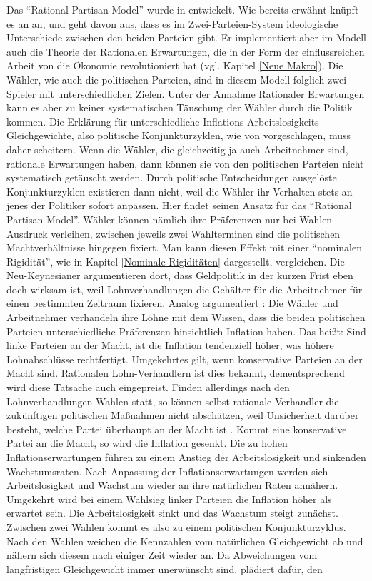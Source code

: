 Das "`Rational Partisan-Model"' wurde in \textcite{Alesina1987} entwickelt. Wie bereits erwähnt knüpft es an \textcite{Hibbs1977} an, und geht davon aus, dass es im Zwei-Parteien-System ideologische Unterschiede zwischen den beiden Parteien gibt. Er implementiert aber im Modell auch die Theorie der Rationalen Erwartungen, die in der Form der einflussreichen Arbeit von \textcite{Kydland1977} die Ökonomie revolutioniert hat (vgl. Kapitel \ref{Neue Makro}). Die Wähler, wie auch die politischen Parteien, sind in diesem Modell folglich zwei Spieler mit unterschiedlichen Zielen. Unter der Annahme Rationaler Erwartungen kann es aber zu keiner systematischen Täuschung der Wähler durch die Politik kommen. Die Erklärung für unterschiedliche Inflations-Arbeitslosigkeits-Gleichgewichte, also politische Konjunkturzyklen, wie von \textcite{Nordhaus1975} vorgeschlagen, muss daher scheitern. Wenn die Wähler, die gleichzeitig ja auch Arbeitnehmer sind, rationale Erwartungen haben, dann können sie von den politischen Parteien nicht systematisch getäuscht werden. Durch politische Entscheidungen ausgelöste Konjunkturzyklen existieren dann nicht, weil die Wähler ihr Verhalten stets an jenes der Politiker sofort anpassen. Hier findet \textcite{Alesina1987} seinen Ansatz für das "`Rational Partisan-Model"'. Wähler können nämlich ihre Präferenzen nur bei Wahlen Ausdruck verleihen, zwischen jeweils zwei Wahlterminen sind die politischen Machtverhältnisse hingegen fixiert. Man kann diesen Effekt mit einer "`nominalen Rigidität"', wie in Kapitel \ref{Nominale Rigiditäten} dargestellt, vergleichen. Die Neu-Keynesianer argumentieren dort, dass Geldpolitik in der kurzen Frist eben doch wirksam ist, weil Lohnverhandlungen die Gehälter für die Arbeitnehmer für einen bestimmten Zeitraum fixieren. Analog argumentiert \textcite{Alesina1987}: Die Wähler und Arbeitnehmer verhandeln ihre Löhne mit dem Wissen, dass die beiden politischen Parteien unterschiedliche Präferenzen hinsichtlich Inflation haben. Das heißt: Sind linke Parteien an der Macht, ist die Inflation tendenziell höher, was höhere Lohnabschlüsse rechtfertigt. Umgekehrtes gilt, wenn konservative Parteien an der Macht sind. Rationalen Lohn-Verhandlern ist dies bekannt, dementsprechend wird diese Tatsache auch eingepreist. Finden allerdings nach den Lohnverhandlungen Wahlen statt, so können selbst rationale Verhandler die zukünftigen politischen Maßnahmen nicht abschätzen, weil Unsicherheit darüber besteht, welche Partei überhaupt an der Macht ist \parencite[S. 653]{Alesina1987}. Kommt eine konservative Partei an die Macht, so wird die Inflation gesenkt. Die zu hohen Inflationserwartungen führen zu einem Anstieg der Arbeitslosigkeit und sinkenden Wachstumsraten. Nach Anpassung der Inflationserwartungen werden sich Arbeitslosigkeit und Wachstum wieder an ihre natürlichen Raten annähern. Umgekehrt wird bei einem Wahlsieg linker Parteien die Inflation höher als erwartet sein. Die Arbeitslosigkeit sinkt und das Wachstum steigt zunächst. Zwischen zwei Wahlen kommt es also zu einem politischen Konjunkturzyklus. Nach den Wahlen weichen die Kennzahlen vom natürlichen Gleichgewicht ab und nähern sich diesem nach einiger Zeit wieder an. Da Abweichungen vom langfristigen Gleichgewicht immer unerwünscht sind, plädiert \textcite[S. 653]{Alesina1987} dafür, den 